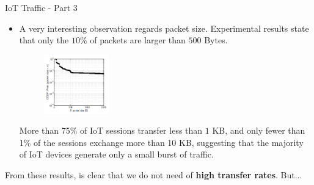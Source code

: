 \documentclass[10pt]{beamer}
\begin{document}
\begin{frame}{IoT Traffic - Part 3}

\begin{itemize}
\justifying
\item A very interesting observation regards packet size. Experimental results state that only the $10\%$ of packets are larger than $500$ Bytes.



\begin{figure}
  \includegraphics[width=80pt]{PacketSize.png}
\end{figure}

\begin{quoting}[font=itshape, begintext={``}, endtext={''\\\textbf{\citet{ITPAReport}}}]
\justifying
More than 75\% of IoT sessions transfer less than $1$ KB, and only fewer than 1\% of the sessions exchange
more than 10 KB, suggesting that the majority of IoT devices generate only a small burst of traffic.
\end{quoting}

\end{itemize}

\begin{alertblock}{}
\justifying
From these results, is clear that we do not need of \textbf{high transfer rates}. But...
\end{alertblock}

\end{frame} 
\end{document}

